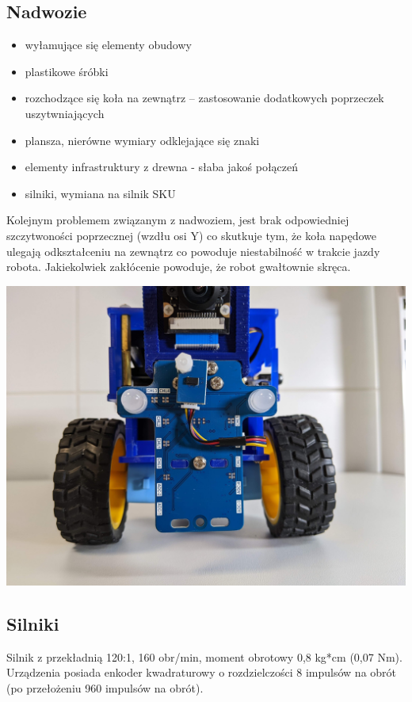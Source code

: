 \documentclass{svproc}
\begin{document}
\subsection{Nadwozie}
\begin{itemize}
\item wyłamujące się elementy obudowy
\item plastikowe śróbki
\item rozchodzące się koła na zewnątrz -- zastosowanie dodatkowych poprzeczek uszytwniających
\item plansza, nierówne wymiary odklejające się znaki
\item elementy infrastruktury z drewna - słaba jakoś połączeń
\item silniki, wymiana na silnik SKU 
\end{itemize}

Kolejnym problemem związanym z nadwoziem, jest brak odpowiedniej szczytwoności poprzecznej (wzdłu osi Y) co skutkuje tym, 
że koła napędowe ulegają odkształceniu na zewnątrz co powoduje niestabilność w trakcie jazdy robota.
Jakiekolwiek zakłócenie powoduje, że robot gwałtownie skręca.

\includegraphics[width=\columnwidth]{PXL_20221207_092836283.jpg}

\subsection{Silniki}
Silnik z przekładnią 120:1, 160 obr/min, moment obrotowy 0,8 kg*cm (0,07 Nm). Urządzenia posiada enkoder kwadraturowy o rozdzielczości 8 impulsów na obrót (po przełożeniu 960 impulsów na obrót).
\end{document}
